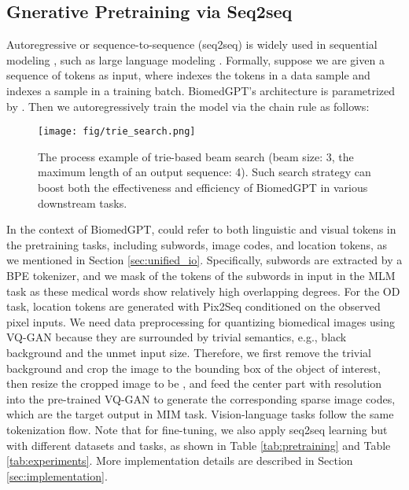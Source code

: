 \documentclass[10pt]{article} \usepackage[preprint]{tmlr}
\begin{document}
\subsection{Gnerative Pretraining via Seq2seq} \label{sec:autoreg}
Autoregressive or sequence-to-sequence (seq2seq) is widely used in sequential modeling \citep{sutskever2014sequence, cho-etal-2014-learning, oord2016wavenet}, such as large language modeling \cite{lewis2019bart, raffel2020exploring}. Formally, suppose we are given a sequence of tokens  as input, where  indexes the tokens in a data sample and  indexes a sample in a training batch. BiomedGPT's architecture is parametrized by . Then we autoregressively train the model via the chain rule as follows:


\begin{wrapfigure}{r}{0.5\textwidth}
  \begin{center}
    \texttt{[image: fig/trie\_search.png]}
  \end{center}
  \caption{The process example of trie-based beam search (beam size: 3, the maximum length of an output sequence: 4). Such search strategy can boost both the effectiveness and efficiency of BiomedGPT in various downstream tasks.} 
  \label{fig:trie}
\end{wrapfigure}
In the context of BiomedGPT,  could refer to both linguistic and visual tokens in the pretraining tasks, including subwords, image codes, and location tokens, as we mentioned in Section \ref{sec:unified_io}. Specifically, subwords are extracted by a BPE tokenizer, and we mask  of the tokens of the subwords in input in the MLM task as these medical words show relatively high overlapping degrees. For the OD task, location tokens are generated with Pix2Seq \citep{chen2022pixseq} conditioned on the observed pixel inputs. We need data preprocessing for quantizing biomedical images using VQ-GAN \citep{esser2021taming} because they are surrounded by trivial semantics, e.g., black background and the unmet input size. Therefore, we first remove the trivial background and crop the image to the bounding box of the object of interest, then resize the cropped image to be , and feed the center part with  resolution into the pre-trained VQ-GAN to generate the corresponding sparse image codes, which are the target output in MIM task. Vision-language tasks follow the same tokenization flow. Note that for fine-tuning, we also apply seq2seq learning but with different datasets and tasks, as shown in Table \ref{tab:pretraining} and Table \ref{tab:experiments}. More implementation details are described in Section \ref{sec:implementation}. 
\end{document}
